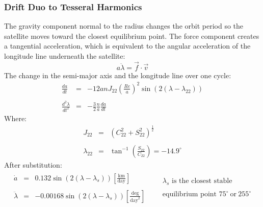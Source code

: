\documentclass[12pt, a4paper]{article}
\begin{document}
\subsubsection{Drift Duo to Tesseral Harmonics}
The gravity component normal to the radius changes the orbit period so the satellite moves toward the closest equilibrium point. The force component creates a tangential acceleration, which is equivalent to the angular acceleration of the longitude line underneath the satellite:
\begin{equation}
    a\ddot{\lambda}=\vec{f}\cdot\vec{v}
\end{equation}
The change in the semi-major axis and the longitude line over one cycle:
\begin{equation}
    \begin{array}{rcl}
        \displaystyle\frac{da}{dt}&=&\displaystyle-12anJ_{22}\left(\frac{Re}{a}\right)^2\sin\left(2\left(\lambda-\lambda_{22}\right)\right) \\\\
        \displaystyle\frac{d^2\lambda}{dt^2}&=&\displaystyle-\frac{3}{2}\frac{n}{a}\frac{da}{dt}
    \end{array}
\end{equation}
Where:
\begin{equation}
    \begin{array}{rcl}
        \displaystyle J_{22}&=&\displaystyle\left(C_{22}^2+S_{22}^2\right)^{\frac{1}{2}} \\\\
        \displaystyle\lambda_{22}&=&\displaystyle\tan^{-1}\left(\frac{S_{22}}{C_{22}}\right)=-14.9^\circ
    \end{array}
\end{equation}
After substitution:
\begin{equation}
    \begin{matrix}
        \begin{array}{rcl}
            \dot{a}&=&\displaystyle0.132\sin\left(2\left(\lambda-\lambda_s\right)\right)\left[\frac{\mathrm{km}}{\mathrm{day}}\right] \\\\
            \ddot{\lambda}&=&\displaystyle-0.00168\sin\left(2\left(\lambda-\lambda_s\right)\right)\left[\frac{\mathrm{deg}}{\mathrm{day}^2}\right]
        \end{array} && \substack{\displaystyle\lambda_s\text{ is the closest stable}\\\\\displaystyle\text{equilibrium point }75^\circ\ \mathrm{or}\ 255^\circ}
    \end{matrix}
\end{equation}
\end{document}

